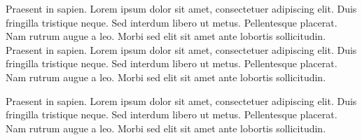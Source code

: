 Praesent in sapien. Lorem ipsum dolor sit amet, consectetuer 
adipiscing elit. Duis fringilla tristique neque. Sed interdum 
libero ut metus. Pellentesque placerat. Nam rutrum augue a leo. 
Morbi sed elit sit amet ante lobortis sollicitudin.
Praesent in sapien. Lorem ipsum dolor sit amet, consectetuer 
adipiscing elit. Duis fringilla tristique neque. Sed interdum 
libero ut metus. Pellentesque placerat. Nam rutrum augue a leo. 
Morbi sed elit sit amet ante lobortis sollicitudin.


Praesent in sapien. Lorem ipsum dolor sit amet, consectetuer 
adipiscing elit. Duis fringilla tristique neque. Sed interdum 
libero ut metus. Pellentesque placerat. Nam rutrum augue a leo. 
Morbi sed elit sit amet ante lobortis sollicitudin.


